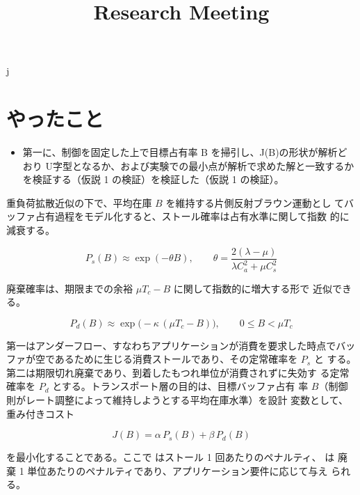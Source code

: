 \documentclass[conference]{IEEEtran}
\date{}
\title{}
\begin{document}
\title{Research Meeting}

\author{
}

\maketitle



\clearpage

j
\section{やったこと}
\label{sec:orgd88ef10}

\begin{itemize}
\item 第一に、制御を固定した上で目標占有率 B を掃引し、J(B)の形状が解析ど
おり U字型となるか、および実験での最小点が解析で求めた解と一致するか
を検証する（仮説 1 の検証）を検証した（仮説 1 の検証）。
\end{itemize}

重負荷拡散近似の下で、平均在庫 \(B\) を維持する片側反射ブラウン運動とし
てバッファ占有過程をモデル化すると、ストール確率は占有水準に関して指数
的に減衰する。

$$ P_s(B) \approx \exp(-\theta B), \qquad \theta = \frac{2(\lambda -
\mu)}{\lambda C_a^2 + \mu C_s^2} $$

廃棄確率は、期限までの余裕 \(\mu T_c - B\) に関して指数的に増大する形で
近似できる。

$$ P_d(B) \approx \exp\!\bigl(-\kappa\,(\mu T_c - B)\bigr), \qquad 0
\le B < \mu T_c $$

第一はアンダーフロー、すなわちアプリケーションが消費を要求した時点でバッ
ファが空であるために生じる消費ストールであり、その定常確率を \(P_s\) と
する。第二は期限切れ廃棄であり、到着したもつれ単位が消費されずに失効す
る定常確率を \(P_d\) とする。トランスポート層の目的は、目標バッファ占有
率 \(B\)（制御則がレート調整によって維持しようとする平均在庫水準）を設計
変数として、重み付きコスト

$$
J(B) = \alpha \, P_s(B) + \beta \, P_d(B)
$$

を最小化することである。ここで はストール 1 回あたりのペナルティ、 は
廃棄 1 単位あたりのペナルティであり、アプリケーション要件に応じて与え
られる。
\end{document}

